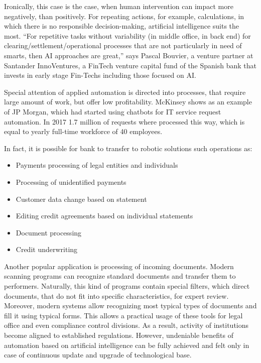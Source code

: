 Ironically, this case is the case, when human intervention can impact more negatively, than positively.
For repeating actions, for example, calculations, in which there is no responsible decision-making, artificial intelligence suits the most.
“For repetitive tasks without variability (in middle office, in back end) for clearing/settlement/operational processes that are not particularly in need of smarts, 
then AI approaches are great,” says Pascal Bouvier, a venture partner at Santander InnoVentures, a FinTech venture capital fund of the Spanish bank that invests in early stage Fin-Techs including those focused on AI.
\cite{ai_reality_hype}


Special attention of applied automation is directed into processes, that require large amount of work, but offer low profitability.
McKinsey shows as an example of JP Morgan, which had started using chatbots for IT service request automation.
In 2017 1.7 million of requests where processed this way, which is equal to yearly full-time workforce of 40 employees.
\cite{ways_ai_transforming_bi}


In fact, it is possible for bank to transfer to robotic solutions such operations as:
\begin{itemize}[noitemsep]
    \item Payments processing of legal entities and individuals
    \item Processing of unidentified payments
    \item Customer data change based on statement
    \item Editing credit agreements based on individual statements
    \item Document processing
    \item Credit underwriting
\end{itemize}

Another popular application is processing of incoming documents.
Modern scanning programs can recognize standard documents and transfer them to performers.
Naturally, this kind of programs contain special filters, which direct documents, that do not fit into specific characteristics, for expert review.
Moreover, modern systems allow recognizing most typical types of documents and fill it using typical forms.
This allows a practical usage of these tools for legal office and even compliance control divisions.
As a result, activity of institutions become aligned to established regulations.
However, undeniable benefits of automation based on artificial intelligence can be fully achieved and felt only in case of continuous update and upgrade of technological base.
\cite{banking_ai_revolution}

